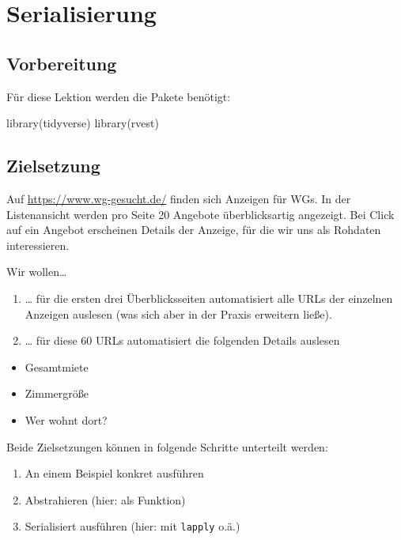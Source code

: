 \documentclass[
  ngerman,
]{article}
\newenvironment{Shaded}{\begin{snugshade}}{\end{snugshade}}
\newcommand{\FunctionTok}[1]{\textcolor[rgb]{0.00,0.00,0.00}{#1}}
\newcommand{\NormalTok}[1]{#1}
\providecommand{\tightlist}{%
  \setlength{\itemsep}{0pt}\setlength{\parskip}{0pt}}
\begin{document}
\hypertarget{serialisierung}{%
\section{Serialisierung}\label{serialisierung}}

\hypertarget{vorbereitung-5}{%
\subsection{Vorbereitung}\label{vorbereitung-5}}

Für diese Lektion werden die Pakete benötigt:

\begin{Shaded}
\begin{Highlighting}[]
\FunctionTok{library}\NormalTok{(tidyverse)}
\FunctionTok{library}\NormalTok{(rvest)}
\end{Highlighting}
\end{Shaded}

\hypertarget{zielsetzung}{%
\subsection{Zielsetzung}\label{zielsetzung}}

Auf \url{https://www.wg-gesucht.de/} finden sich Anzeigen für WGs. In der Listenansicht werden pro Seite 20 Angebote überblicksartig angezeigt. Bei Click auf ein Angebot erscheinen Details der Anzeige, für die wir uns als Rohdaten interessieren.

Wir wollen\ldots{}

\begin{enumerate}
\def\labelenumi{\arabic{enumi}.}
\tightlist
\item
  \ldots{} für die ersten drei Überblicksseiten automatisiert alle URLs der einzelnen Anzeigen auslesen (was sich aber in der Praxis erweitern ließe).
\item
  \ldots{} für diese 60 URLs automatisiert die folgenden Details auslesen
\end{enumerate}

\begin{itemize}
\tightlist
\item
  Gesamtmiete
\item
  Zimmergröße
\item
  Wer wohnt dort?
\end{itemize}

Beide Zielsetzungen können in folgende Schritte unterteilt werden:

\begin{enumerate}
\def\labelenumi{\arabic{enumi}.}
\tightlist
\item
  An einem Beispiel konkret ausführen
\item
  Abstrahieren (hier: als Funktion)
\item
  Serialisiert ausführen (hier: mit \texttt{lapply} o.ä.)
\end{enumerate}
\end{document}
